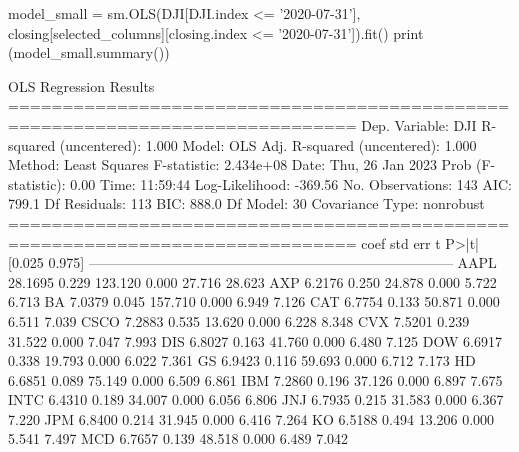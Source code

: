 \begin{solution}
\begin{ipython}
model_small = sm.OLS(DJI[DJI.index <= '2020-07-31'], 
                     closing[selected_columns][closing.index <= '2020-07-31']).fit()
print (model_small.summary())
\end{ipython}
\begin{ioutput}
                        OLS Regression Results                                
==============================================================================
Dep. Variable:                    DJI   R-squared (uncentered):          1.000
Model:                            OLS   Adj. R-squared (uncentered):     1.000
Method:                 Least Squares   F-statistic:                 2.434e+08
Date:                Thu, 26 Jan 2023   Prob (F-statistic):               0.00
Time:                        11:59:44   Log-Likelihood:                -369.56
No. Observations:                 143   AIC:                             799.1
Df Residuals:                     113   BIC:                             888.0
Df Model:                          30                                                  
Covariance Type:            nonrobust                                                  
==============================================================================
                 coef    std err          t      P>|t|      [0.025      0.975]
------------------------------------------------------------------------------
AAPL          28.1695      0.229    123.120      0.000      27.716      28.623
AXP            6.2176      0.250     24.878      0.000       5.722       6.713
BA             7.0379      0.045    157.710      0.000       6.949       7.126
CAT            6.7754      0.133     50.871      0.000       6.511       7.039
CSCO           7.2883      0.535     13.620      0.000       6.228       8.348
CVX            7.5201      0.239     31.522      0.000       7.047       7.993
DIS            6.8027      0.163     41.760      0.000       6.480       7.125
DOW            6.6917      0.338     19.793      0.000       6.022       7.361
GS             6.9423      0.116     59.693      0.000       6.712       7.173
HD             6.6851      0.089     75.149      0.000       6.509       6.861
IBM            7.2860      0.196     37.126      0.000       6.897       7.675
INTC           6.4310      0.189     34.007      0.000       6.056       6.806
JNJ            6.7935      0.215     31.583      0.000       6.367       7.220
JPM            6.8400      0.214     31.945      0.000       6.416       7.264
KO             6.5188      0.494     13.206      0.000       5.541       7.497
MCD            6.7657      0.139     48.518      0.000       6.489       7.042

\end{ioutput}
\end{solution}
